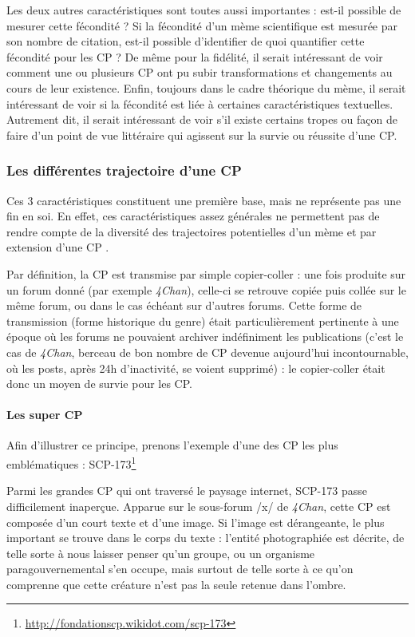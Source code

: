 \documentclass[12pt,a4paper,oneside,titlepage]{article} %
\begin{document}
 Les deux autres caractéristiques sont toutes aussi importantes : est-il possible de mesurer cette fécondité ? Si la fécondité d’un mème scientifique est mesurée par son nombre de citation, est-il possible d’identifier de quoi quantifier cette fécondité pour les CP ? De même pour la fidélité, il serait intéressant de voir comment une ou plusieurs CP ont pu subir transformations et changements au cours de leur existence. Enfin, toujours dans le cadre théorique du mème, il serait intéressant de voir si la fécondité est liée à certaines caractéristiques textuelles. Autrement dit, il serait intéressant de voir s’il existe certains tropes ou façon de faire d’un point de vue littéraire qui agissent sur la survie ou réussite d’une CP.
	
	\subsubsection*{Les différentes trajectoire d'une CP}
	
	Ces 3 caractéristiques constituent une première base, mais ne représente pas une fin en soi. En effet, ces caractéristiques assez générales ne permettent pas de rendre compte de la diversité des trajectoires potentielles d’un mème et par extension d’une CP .
	
	Par définition, la CP est transmise par simple copier-coller : une fois produite sur un forum donné (par exemple \emph{4Chan}), celle-ci se retrouve copiée puis collée sur le même forum, ou dans le cas échéant sur d’autres forums. Cette forme de transmission (forme historique du genre) était particulièrement pertinente à une époque où les forums ne pouvaient archiver indéfiniment les publications (c’est le cas de \emph{4Chan}, berceau de bon nombre de CP devenue aujourd’hui incontournable, où les posts, après 24h d'inactivité, se voient supprimé) : le copier-coller était donc un moyen de survie pour les CP. 
	
	\paragraph*{Les super CP}
	
	Afin d'illustrer ce principe, prenons l'exemple d'une des CP les plus emblématiques : SCP-173\footnote{\url{http://fondationscp.wikidot.com/scp-173}}
	
	Parmi les grandes CP qui ont traversé le paysage internet, SCP-173 passe difficilement inaperçue. Apparue sur le sous-forum /x/ de \emph{4Chan}, cette CP est composée d'un court texte et d'une image. Si l'image est dérangeante, le plus important se trouve dans le corps du texte : l'entité photographiée est décrite, de telle sorte à nous laisser penser qu'un groupe, ou un organisme paragouvernemental s'en occupe, mais surtout de telle sorte à ce qu’on comprenne que cette créature n'est pas la seule retenue dans l’ombre. 
\end{document}
